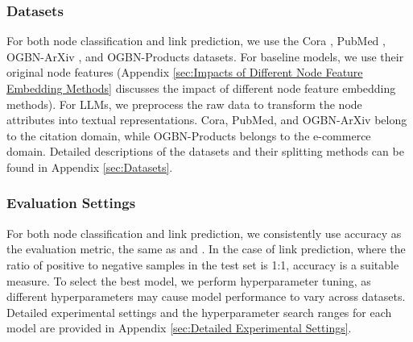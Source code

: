 \subsubsection{Datasets}
For both node classification and link prediction, we use the Cora \cite{cora}, PubMed \cite{pubmed}, OGBN-ArXiv \cite{ogb}, and OGBN-Products \cite{ogb} datasets. For baseline models, we use their original node features (Appendix \ref{sec:Impacts of Different Node Feature Embedding Methods} discusses the impact of different node feature embedding methods). For LLMs, we preprocess the raw data to transform the node attributes into textual representations. Cora, PubMed, and OGBN-ArXiv belong to the citation domain, while OGBN-Products belongs to the e-commerce domain. Detailed descriptions of the datasets and their splitting methods can be found in Appendix \ref{sec:Datasets}.

\subsubsection{Evaluation Settings}
For both node classification and link prediction, we consistently use accuracy as the evaluation metric, the same as \cite{chen2024llaga} and \cite{instructglm}. In the case of link prediction, where the ratio of positive to negative samples in the test set is 1:1, accuracy is a suitable measure. To select the best model, we perform hyperparameter tuning, as different hyperparameters may cause model performance to vary across datasets. 
Detailed experimental settings and the hyperparameter search ranges for each model are provided in Appendix \ref{sec:Detailed Experimental Settings}.





